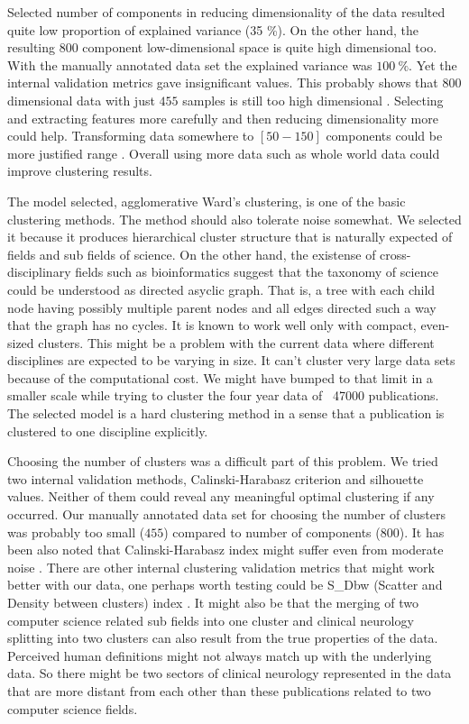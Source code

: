 Selected number of components in reducing dimensionality of the 
data resulted quite low proportion of explained variance (35 \%).
On the other hand, the resulting $800$ component low-dimensional
space is quite high dimensional too.
With the manually annotated data set the explained variance was 
$100\ \%$. Yet the internal validation metrics gave insignificant 
values. This probably shows that $800$ dimensional data with just 
$455$ samples is still too high dimensional \cite{aggarwal_surprising_2001}. 
Selecting and extracting features more carefully and then reducing
dimensionality more could help. Transforming data somewhere to 
$[50-150]$ components could be more justified range 
\cite{dolnicar_review_2002}. Overall using more data such as whole
world data could improve clustering results.

The model selected, agglomerative Ward's clustering, is one of the
basic clustering methods. The method should also tolerate noise 
somewhat. We selected it because it produces 
hierarchical cluster structure that is naturally expected of fields
and sub fields of science. On the other hand, the existense of cross-
disciplinary fields such as bioinformatics suggest that the 
taxonomy of science could be understood as directed asyclic graph.
That is, a tree with each child node having possibly multiple 
parent nodes and all edges directed such a way that the graph has 
no cycles.
It is known to work well only with compact, even-sized clusters.
This might be a problem with the current data where different 
disciplines are expected to be varying in size.
It can't cluster very large data sets because of the computational
cost. We might have bumped to that limit in a smaller scale while 
trying to cluster the four year data of ~47000 publications.
The selected model is a hard clustering method in a sense that a
publication is clustered to one discipline explicitly.


Choosing the number of clusters was a difficult part of this 
problem. We tried two internal validation methods,
Calinski-Harabasz criterion and silhouette values. Neither of them
could reveal any meaningful optimal clustering if any occurred.
Our manually annotated data set for choosing the number of clusters
was probably too small ($455$) compared to number of components 
($800$). 
It has been also noted that Calinski-Harabasz index 
might suffer even from moderate noise \cite{liu_understanding_2010}.
There are other internal clustering validation metrics that might 
work better with our data, one perhaps worth testing could be
S\_Dbw (Scatter and Density between clusters) index 
\cite{halkidi_clustering_2001}. 
It might also be that the merging of two computer science related 
sub fields into one cluster and clinical neurology splitting into 
two clusters can also result from the true properties of the data.
Perceived human definitions might not always match up with the 
underlying data. So there might be two sectors of clinical 
neurology represented in the data that are more distant from each 
other than these publications related to two computer science fields.

